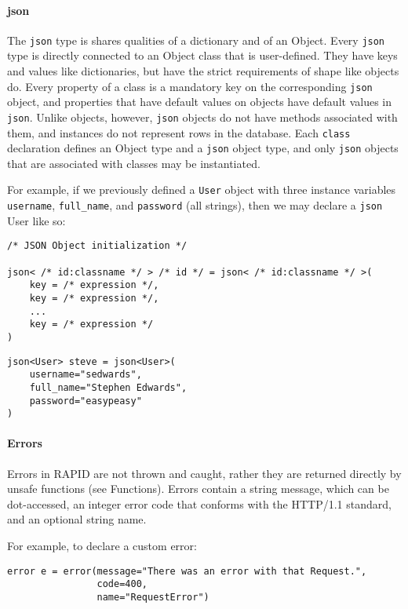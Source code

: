 \paragraph{json}\label{json}

The \texttt{json} type is shares qualities of a dictionary and of an
Object. Every \texttt{json} type is directly connected to an Object
class that is user-defined. They have keys and values like dictionaries,
but have the strict requirements of shape like objects do. Every
property of a class is a mandatory key on the corresponding
\texttt{json} object, and properties that have default values on objects
have default values in \texttt{json}. Unlike objects, however,
\texttt{json} objects do not have methods associated with them, and
instances do not represent rows in the database. Each \texttt{class}
declaration defines an Object type and a \texttt{json} object type, and
only \texttt{json} objects that are associated with classes may be
instantiated.

For example, if we previously defined a \texttt{User} object with three
instance variables \texttt{username}, \texttt{full\_name}, and
\texttt{password} (all strings), then we may declare a \texttt{json}
User like so:

\begin{verbatim}
/* JSON Object initialization */

json< /* id:classname */ > /* id */ = json< /* id:classname */ >(
    key = /* expression */,
    key = /* expression */,
    ...
    key = /* expression */
)
\end{verbatim}

\begin{verbatim}
json<User> steve = json<User>(
    username="sedwards",
    full_name="Stephen Edwards",
    password="easypeasy"
)
\end{verbatim}

\paragraph{Errors}\label{errors}

Errors in RAPID are not thrown and caught, rather they are returned
directly by unsafe functions (see Functions). Errors contain a string
message, which can be dot-accessed, an integer error code that conforms
with the HTTP/1.1 standard, and an optional string name.

For example, to declare a custom error:

\begin{verbatim}
error e = error(message="There was an error with that Request.",
                code=400,
                name="RequestError")
\end{verbatim}

